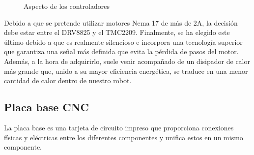 \begin{figure} [h!]
  \centering    
  \hspace{0.5cm}
  \hspace{0.5cm}
  \hspace{0.5cm}
  \caption[Controladores existentes en el mercado]{Aspecto de los controladores}
  \label{fig:controladores}
\end{figure}

Debido a que se pretende utilizar motores Nema 17 de más de 2A, la decisión debe estar entre el DRV8825 y el TMC2209. Finalmente, se 
ha elegido este último debido a que es realmente silencioso e incorpora una tecnología superior que garantiza una señal más definida que 
evita la pérdida de pasos del motor. Además, a la hora de adquirirlo, suele venir acompañado de un disipador de calor más grande que, unido 
a su mayor eficiencia energética, se traduce en una menor cantidad de calor dentro de nuestro robot. 

\subsection{Placa base CNC}
\noindent La placa base es una tarjeta de circuito impreso que proporciona conexiones físicas y eléctricas entre los diferentes componentes y 
unifica estos en un mismo componente. 

